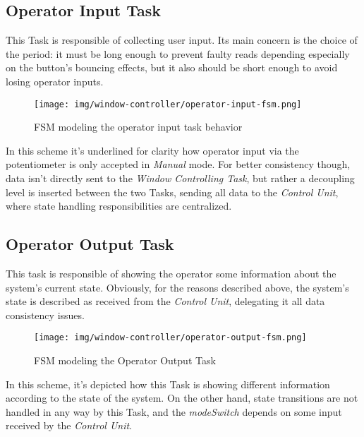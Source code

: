 \documentclass[a4paper,12pt]{report}
\begin{document}
		\subsection{Operator Input Task}
		This Task is responsible of collecting user input. Its main concern is the choice of the period: it must be long enough to prevent faulty reads depending especially on the button's bouncing effects, but it also should be short enough to avoid losing operator inputs.
		\begin{figure}[H]
			\centering{}
			\texttt{[image: img/window-controller/operator-input-fsm.png]}
			\caption{FSM modeling the operator input task behavior}
			\label{img:window-controller/operator-input-fsm}
		\end{figure}
		In this scheme it's underlined for clarity how operator input via the potentiometer is only accepted in \textit{Manual} mode. For better consistency though, data isn't directly sent to the \textit{Window Controlling Task}, but rather a decoupling level is inserted between the two Tasks, sending all data to the \textit{Control Unit}, where state handling responsibilities are centralized.
		\subsection{Operator Output Task}
		This task is responsible of showing the operator some information about the system's current state. Obviously, for the reasons described above, the system's state is described as received from the \textit{Control Unit}, delegating it all data consistency issues.
		\begin{figure}[H]
			\centering{}
			\texttt{[image: img/window-controller/operator-output-fsm.png]}
			\caption{FSM modeling the Operator Output Task}
			\label{img:window-controller/operator-output-fsm}
		\end{figure}
		In this scheme, it's depicted how this Task is showing different information according to the state of the system. On the other hand, state transitions are not handled in any way by this Task, and the \textit{modeSwitch} depends on some input received by the \textit{Control Unit}.
\end{document}
